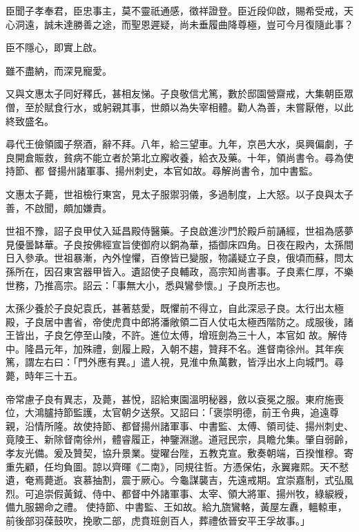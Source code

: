 \begin{pinyinscope}
 臣聞子孝奉君，臣忠事主，莫不靈祇通感，徵祥證登。臣近段仰啟，賜希受戒，天心洞遠，誠未達勝善之途，而聖恩遲疑，尚未垂履曲降尊極，豈可今月復隨此事？



 臣不隱心，即實上啟。



 雖不盡納，而深見寵愛。



 又與文惠太子同好釋氏，甚相友悌。子良敬信尤篤，數於邸園營齋戒，大集朝臣眾僧，至於賦食行水，或躬親其事，世頗以為失宰相體。勸人為善，未嘗厭倦，以此終致盛名。



 尋代王儉領國子祭酒，辭不拜。八年，給三望車。九年，京邑大水，吳興偏劇，子良開倉賑救，貧病不能立者於第北立廨收養，給衣及藥。十年，領尚書令。尋為使持節、都
 督揚州諸軍事、揚州刺史，本官如故。尋解尚書令，加中書監。



 文惠太子薨，世祖檢行東宮，見太子服禦羽儀，多過制度，上大怒。以子良與太子善，不啟聞，頗加嫌責。



 世祖不豫，詔子良甲仗入延昌殿侍醫藥。子良啟進沙門於殿戶前誦經，世祖為感夢見優曇缽華。子良按佛經宣旨使御府以銅為華，插御床四角。日夜在殿內，太孫間日入參承。世祖暴漸，內外惶懼，百僚皆已變服，物議疑立子良，俄頃而蘇，問太孫所在，因召東宮器甲皆入。遺詔使子良輔政，高宗知尚書事。子良素仁厚，不樂世務，乃推高宗。詔云：「事無大小，悉與鸞參懷。」子良所志也。



 太孫少養於子良妃袁氏，甚著慈愛，既懼前不得立，自此深忌子良。太行出太極殿，子良居中書省，帝使虎賁中郎將潘敞領二百人仗屯太極西階防之。成服後，諸王皆出，子良乞停至山陵，不許。進位太傅，增班劍為三十人，本官如
 故。解侍中。隆昌元年，加殊禮，劍履上殿，入朝不趨，贊拜不名。進督南徐州。其年疾篤，謂左右曰：「門外應有異。」遣人視，見淮中魚萬數，皆浮出水上向城門。尋薨，時年三十五。



 帝常慮子良有異志，及薨，甚悅，詔給東園溫明秘器，斂以袞冕之服。東府施喪位，大鴻臚持節監護，太官朝夕送祭。又詔曰：「褒崇明德，前王令典，追遠尊親，沿情所隆。故使持節、都督揚州諸軍事、中書監、太傅、領司徒、揚州刺史、竟陵王、新除督南徐州，體睿履正，神鑒淵邈。道冠民宗，具瞻允集。肇自弱齡，孝友光備。爰及贊契，協升景業。燮曜台陛，五教克宣。敷奏朝端，百揆惟穆。寄重先顧，任均負圖。諒以齊暉《二南》，同規往哲。方憑保佑，永翼雍熙。天不憖遺，奄焉薨逝。哀慕抽割，震于厥心。今龜謀襲吉，先遠戒期。宜崇嘉制，式弘風烈。可追崇假黃鉞、侍中、都督中外諸軍事、太宰、領大將軍、揚州牧，綠綟綬，備九服錫命之禮。
 使持節、中書監、王如故。給九旒鸞輅，黃屋左纛，轀輬車，前後部羽葆鼓吹，挽歌二部，虎賁班劍百人，葬禮依晉安平王孚故事。」




\end{pinyinscope}
